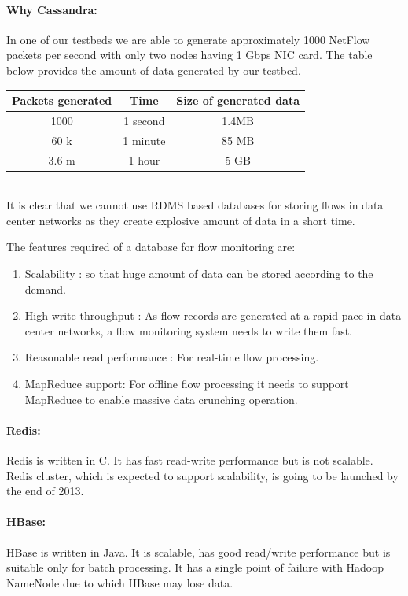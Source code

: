       \paragraph{Why Cassandra:} In one of our testbeds we are able to generate approximately 1000 NetFlow packets per second with only two nodes
      having 1 Gbps NIC card. The table below provides the amount of data generated by our testbed.\\
      \begin{tabular}{ccc}
      \\
      \hline
	  Packets generated& Time & Size of generated data \\
	  \hline
	  1000   & 1 second & 1.4MB\\
	  60 k   & 1 minute & 85 MB\\
	  3.6 m  & 1 hour    &  5 GB\\
      \end{tabular}\\

      It is clear that we cannot use RDMS based databases for storing flows in data center networks as they create explosive amount of data in a short time. 

      The features required of a database for flow monitoring are:
      \begin{enumerate}
       \item Scalability : so that huge amount of data can be stored according to the demand.
       \item High write throughput : As flow records are generated at a rapid pace in data center networks, a flow monitoring system needs to write them fast.
       \item Reasonable read performance : For real-time flow processing.
       \item MapReduce support: For offline flow processing it needs to support MapReduce to enable massive data crunching operation.
      \end{enumerate}

      \paragraph{Redis:} Redis is written in C. It has fast read-write performance but is not scalable. Redis cluster, which is expected to support scalability, is going to be launched by the end of 2013\cite{rrdcluster}. 
      \paragraph{HBase:} HBase is written in Java. It is scalable, has good read/write performance but is suitable only for batch processing. It has a single point of failure with Hadoop NameNode due to which HBase may lose data.

